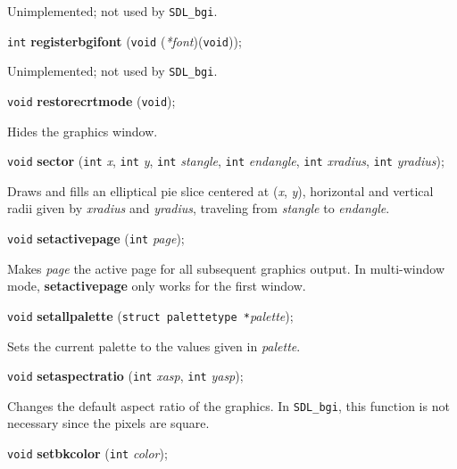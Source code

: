 \documentclass[a4paper,11pt]{article}
\newcommand{\SDLbgi}{\texttt{SDL\_bgi}}
\newcommand{\V}{\texttt{void}}      %
\newcommand{\I}{\texttt{int}}       %
\newcommand{\func}[1]{\textbf{#1}}  %
\newcommand{\A}[1]{\emph{#1}}       %
\newenvironment{bgi}
{ %
  \begin{snugshade}
}
{ %
  \end{snugshade}
}
\begin{document}
Unimplemented; not used by \SDLbgi.


\begin{bgi}
\I{} \func{registerbgifont} (\V{} (\A{*font})(\V{})); 
\end{bgi}

Unimplemented; not used by \SDLbgi.


\begin{bgi}
\V{} \func{restorecrtmode} (\V{}); 
\end{bgi}

Hides the graphics window.


\begin{bgi}
\V{} \func{sector} (\I{} \A{x}, \I{} \A{y}, \I{} \A{stangle}, \I{}
\A{endangle}, \I{} \A{xradius}, \I{} \A{yradius});
\end{bgi}

Draws and fills an elliptical pie slice centered at (\A{x}, \A{y}),
horizontal and vertical radii given by \A{xradius} and \A{yradius},
traveling from \A{stangle} to \A{endangle}.


\begin{bgi}
\V{} \func{setactivepage} (\I{} \A{page});
\end{bgi}

Makes \A{page} the active page for all subsequent graphics output. In
multi-window mode, \func{setactivepage} only works for the first window.


\begin{bgi}
\V{} \func{setallpalette} (\texttt{struct palettetype *}\A{palette}); 
\end{bgi}

Sets the current palette to the values given in \A{palette}.


\begin{bgi}
\V{} \func{setaspectratio} (\I{} \A{xasp}, \I{} \A{yasp});
\end{bgi}

Changes the default aspect ratio of the graphics. In \SDLbgi, this
function is not necessary since the pixels are square.


\begin{bgi}
\V{} \func{setbkcolor} (\I{} \A{color});
\end{bgi}
\end{document}
